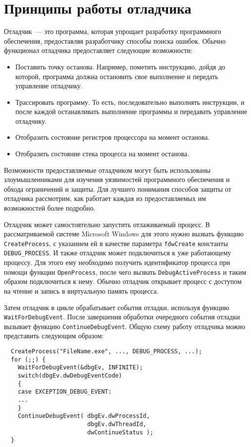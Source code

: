 \section{Принципы работы отладчика}
Отладчик~--- это программа, которая упрощает разработку программного
обеспечения, предоставляя разработчику способы поиска ошибок. Обычно функционал
отладчика предоставляет следующие возможности:
\begin{itemize}
  \item Поставить точку останова. Например, пометить инструкцию, дойдя до
    которой, программа должна остановить свое выполнение и передать управление
    отладчику.
  \item Трассировать программу. То есть, последовательно выполнять инструкции, и
    после каждой останавливать выполнение программы и передавать управление
    отладчику.
  \item Отобразить состояние регистров процессора на момент останова.
  \item Отобразить состояние стека процесса на момент останова.
\end{itemize}

Возможности предоставляемые отладчиком могут быть использованы злоумышленниками
для изучения уязвимостей программного обеспечения и обхода ограничений и защиты.
Для лучшего понимания способов защиты от отладчика рассмотрим, как работает
каждая из предоставляемых им возможностей более подробно.

Отладчик может самостоятельно запустить отлаживаемый процесс. В рассматриваемой
системе Microsoft Windows для этого нужно вызвать функцию \verb!CreateProcess!,
с указанием ей в качестве параметра \verb!fdwCreate! константы
\verb!DEBUG_PROCESS!. И также отладчик может подключиться к уже работающему
процессу. Для этого ему необходимо получить идентификатор процесса при помощи
функции \verb!OpenProcess!, после чего вызвать \verb!DebugActiveProcess! и таким
образом подключиться к нему.  Обычно отладчик открывает процесс с доступом на
чтение и запись в виртуальную память процесса.

Затем отладчик в цикле обрабатывает события отладки, используя функцию
\verb!WaitForDebugEvent!. После завершения обработки очередного события отладки
вызывает функцию \verb!ContinueDebugEvent!. Общую схему работу отладчика можно
представить следующим образом:
\begin{verbatim}
  CreateProcess("FileName.exe", ..., DEBUG_PROCESS, ...); 
  for (;;) {
    WaitForDebugEvent(&dbgEv, INFINITE);
    switch(dbgEv.dwDebugEventCode) 
    {
    case EXCEPTION_DEBUG_EVENT:
    ...
    }
    ContinueDebugEvent( dbgEv.dwProcessId,
                        dbgEv.dwThreadId,
                        dwContinueStatus );
  }
\end{verbatim}

